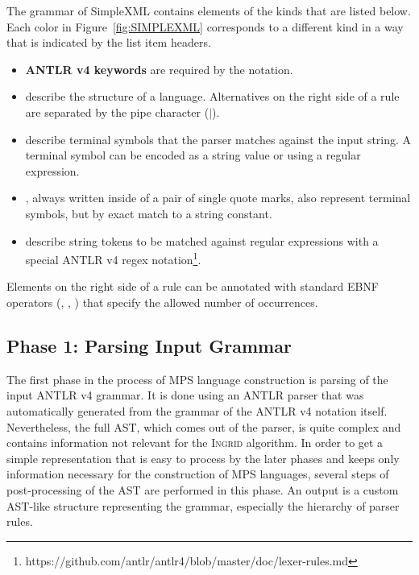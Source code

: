 The grammar of SimpleXML contains elements of the kinds that are listed below.
Each color in Figure~\ref{fig:SIMPLEXML} corresponds to a different kind in a way that is indicated by the list item headers.
\begin{itemize}
	\item \textbf{ANTLR v4 keywords} are required by the notation.
	\item {} describe the structure of a language.
		Alternatives on the right side of a rule are separated by the pipe character ($|$).
	\item {} describe terminal symbols that the parser matches against the input string.
		A terminal symbol can be encoded as a string value or using a regular expression.
	\item {} , always written inside of a pair of single quote marks, also represent terminal symbols, but by exact match to a string constant.
	\item {}  describe string tokens to be matched against regular expressions with a special ANTLR v4 regex notation\footnote{https://github.com/antlr/antlr4/blob/master/doc/lexer-rules.md}.
\end{itemize}
Elements on the right side of a rule can be annotated with standard EBNF operators (, \code{+}, \code{*}) that specify the allowed number of occurrences.

\subsection{Phase 1: Parsing Input Grammar}

The first phase in the process of MPS language construction is parsing of the input ANTLR v4 grammar.
It is done using an ANTLR parser that was automatically generated from the grammar of the ANTLR v4 notation itself.
Nevertheless, the full AST, which comes out of the parser, is quite complex and contains information not relevant for the \textsc{Ingrid} algorithm.
In order to get a simple representation that is easy to process by the later phases and keeps only information necessary for the construction of MPS languages, several steps of post-processing of the AST are performed in this phase.
An output is a custom AST-like structure representing the grammar, especially the hierarchy of parser rules.

